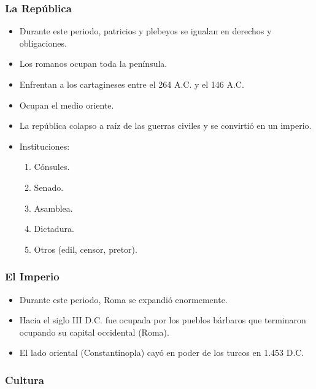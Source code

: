 \subsubsection{La República}

\begin{itemize}

\item Durante este periodo, patricios y plebeyos se igualan en derechos y obligaciones.

\item Los romanos ocupan toda la península.

\item Enfrentan a los cartagineses entre el 264 A.C. y el 146 A.C.

\item Ocupan el medio oriente.

\item La república colapso a raíz de las guerras civiles y se convirtió en un imperio.

\item Instituciones:
\begin{enumerate}
	\item Cónsules.
	\item Senado.
	\item Asamblea.
	\item Dictadura.
	\item Otros (edil, censor, pretor).
\end{enumerate}

\end{itemize}

\subsubsection{El Imperio}

\begin{itemize}

\item Durante este periodo, Roma se expandió enormemente.

\item Hacia el siglo III D.C. fue ocupada por los pueblos bárbaros que terminaron ocupando su capital occidental (Roma).

\item El lado oriental (Constantinopla) cayó en poder de los turcos en 1.453 D.C.

\end{itemize}

\subsubsection{Cultura}

